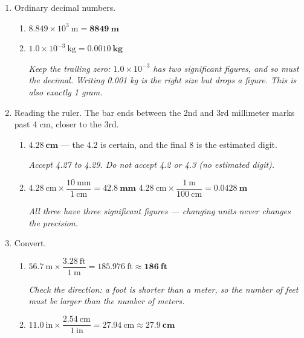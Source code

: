 \documentclass[12pt, twoside]{article}
\begin{document}
\begin{enumerate}[itemsep=0.3cm]
\begin{enumerate}[itemsep=0.15cm]
      \emph{Write 1.50, not 1.5 --- the trailing zero is the third significant figure.}
    \item $0.000102~\text{m} = \mathbf{1.02 \times 10^{-4}~\textbf{m}}$
      \quad (already exactly three figures --- nothing to round)

      \emph{Count the places the decimal point moves: four, to the right, so the
      exponent is negative. That is 0.1 mm, a tenth of a millimeter.}
  \end{enumerate}

\item Ordinary decimal numbers.
  \begin{enumerate}[itemsep=0.15cm]
    \item $8.849 \times 10^{3}~\text{m} = \mathbf{8849~\textbf{m}}$
    \item $1.0 \times 10^{-3}~\text{kg} = \mathbf{0.0010~\textbf{kg}}$

      \emph{Keep the trailing zero: $1.0 \times 10^{-3}$ has two significant figures,
      and so must the decimal. Writing 0.001 kg is the right size but drops a figure.
      This is also exactly 1 gram.}
  \end{enumerate}

\item Reading the ruler. The bar ends between the 2nd and 3rd millimeter marks past 4 cm,
  closer to the 3rd.
  \begin{enumerate}[itemsep=0.15cm]
    \item $\mathbf{4.28~\textbf{cm}}$ --- the 4.2 is certain, and the final 8 is the
      estimated digit.

      \emph{Accept 4.27 to 4.29. Do not accept 4.2 or 4.3 (no estimated digit).}
    \item $4.28~\text{cm} \times \dfrac{10~\text{mm}}{1~\text{cm}} = \mathbf{42.8~\textbf{mm}}$
      \qquad
      $4.28~\text{cm} \times \dfrac{1~\text{m}}{100~\text{cm}} = \mathbf{0.0428~\textbf{m}}$

      \emph{All three have three significant figures --- changing units never changes
      the precision.}
  \end{enumerate}

\item Convert.
  \begin{enumerate}[itemsep=0.15cm]
    \item $56.7~\text{m} \times \dfrac{3.28~\text{ft}}{1~\text{m}}
      = 185.976~\text{ft} \approx \mathbf{186~\textbf{ft}}$

      \emph{Check the direction: a foot is shorter than a meter, so the number of feet
      must be larger than the number of meters.}
    \item $11.0~\text{in} \times \dfrac{2.54~\text{cm}}{1~\text{in}}
      = 27.94~\text{cm} \approx \mathbf{27.9~\textbf{cm}}$
  \end{enumerate}


\end{enumerate}
\end{document}
